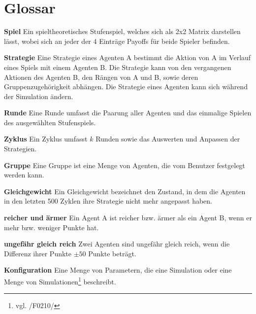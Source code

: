 \section{Glossar}

\textbf{Spiel}
Ein spieltheoretisches Stufenspiel, welches sich als 2x2 Matrix darstellen lässt, wobei sich an jeder der 4 Einträge Payoffs für beide Spieler befinden.

\textbf{Strategie}
Eine Strategie eines Agenten A bestimmt die Aktion von A im Verlauf eines Spiels mit einem Agenten B. Die Strategie kann von den vergangenen Aktionen des Agenten B, den Rängen von A und B, sowie deren Gruppenzugehörigkeit abhängen. Die Strategie eines Agenten kann sich während der Simulation ändern.

\textbf{Runde}
Eine Runde umfasst die Paarung aller Agenten und das einmalige Spielen des ausgewählten Stufenspiels.

\textbf{Zyklus}
Ein Zyklus umfasst $k$ Runden sowie das Auswerten und Anpassen der Strategien.

\textbf{Gruppe}
Eine Gruppe ist eine Menge von Agenten, die vom Benutzer festgelegt werden kann.

\textbf{Gleichgewicht}
Ein Gleichgewicht bezeichnet den Zustand, in dem die Agenten in den letzten 500 Zyklen ihre Strategie nicht mehr angepasst haben.

\textbf{reicher und ärmer}
Ein Agent A ist reicher bzw. ärmer als ein Agent B, wenn er mehr bzw. weniger Punkte hat.

\textbf{ungefähr gleich reich}
Zwei Agenten sind ungefähr gleich reich, wenn die Differenz ihrer Punkte $\pm 50$ Punkte beträgt.

\textbf{Konfiguration}
Eine Menge von Parametern, die eine Simulation oder eine Menge von Simulationen\footnote{vgl. /F0210/} beschreibt.
